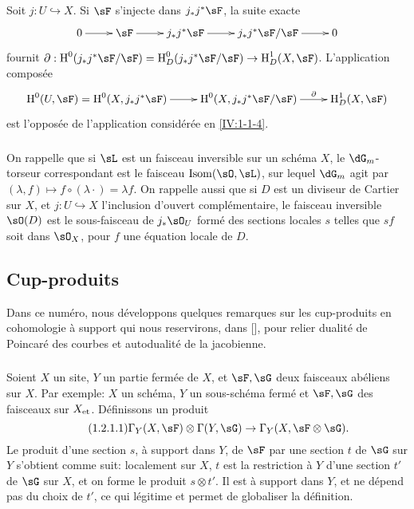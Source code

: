 Soit $j:U\hookrightarrow X$. Si $\sF$ s'injecte dans $j_* j^* \sF$, la suite 
exacte 
\[\xymatrix{
  0 \ar[r] 
  & \sF \ar[r]
  & j_* j^* \sF \ar[r]
  & j_* j^* \sF / \sF \ar[r]
  & 0
}\]
fournit 
$\partial:\h^0(j_* j^*\sF/\sF) = \h_D^0(j_* j^* \sF/\sF) \to \h_D^1(X,\sF)$. 
L'application composée 
\[\xymatrix{
  \h^0(U,\sF) = \h^0(X,j_* j^*\sF) \ar[r] 
    & \h^0(X,j_* j^*\sF / \sF) \ar[r]^-\partial 
    & \h_D^1(X,\sF)
}\]
est l'opposée de l'application considérée en \ref{IV:1-1-4}. 





\subsubsection{}\label{IV:1-1-6}

On rappelle que si $\sL$ est un faisceau inversible sur un schéma $X$, le 
$\dG_m$-torseur correspondant est le faisceau $\operatorname{Isom}(\sO,\sL)$, 
sur lequel $\dG_m$ agit par 
$(\lambda,f)\mapsto f\circ (\lambda\cdot) = \lambda f$. On rappelle aussi que 
si $D$ est un diviseur de Cartier sur $X$, et $j:U\hookrightarrow X$ 
l'inclusion d'ouvert complémentaire, le faisceau inversible $\sO(D)$ est le 
sous-faisceau de $j_*\sO_U$ formé des sections locales $s$ telles que $s f$ 
soit dans $\sO_X$, pour $f$ une équation locale de $D$.










\subsection{Cup-produits}\label{IV:1-2}

Dans ce numéro, nous développons quelques remarques sur les cup-produits en 
cohomologie à support qui nous reservirons, dans [], pour relier 
dualité de Poincaré des courbes et autodualité de la jacobienne.

\subsubsection{}\label{IV:1-2-1}

Soient $X$ un site, $Y$ un partie fermée de $X$, et $\sF,\sG$ deux faisceaux 
abéliens sur $X$. Par exemple: $X$ un schéma, $Y$ un sous-schéma fermé 
et $\sF,\sG$ des faisceaux sur ${X}_{\textnormal{et}}$. Définissons un produit 
\begin{equation*}\tag{1.2.1.1}\label{IV:eq:1-2-1-1}
  \Gamma_Y(X,\sF)\otimes \Gamma(Y,\sG) \to \Gamma_Y(X,\sF\otimes\sG) \text{.}
\end{equation*}
Le produit d'une section $s$, à support dans $Y$, de $\sF$ par une section 
$t$ de $\sG$ sur $Y$ s'obtient comme suit: localement sur $X$, $t$ est la 
restriction à $Y$ d'une section $t'$ de $\sG$ sur $X$, et on forme le produit 
$s\otimes t'$. Il est à support dans $Y$, et ne dépend pas du choix de 
$t'$, ce qui légitime et permet de globaliser la définition.

